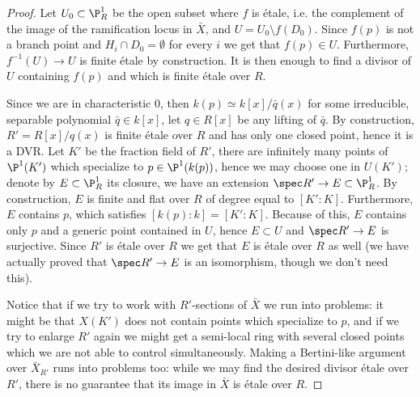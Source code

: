 \begin{lemma}
\begin{proof}
		Let $U_{0}\subset\P^{1}_{R}$ be the open subset where $f$ is étale, i.e. the complement of the image of the ramification locus in $\bar{X}$, and $U=U_{0}\setminus f(D_{0})$. Since $f(p)$ is not a branch point and $H_{i}\cap D_{0}=\emptyset$ for every $i$ we get that $f(p)\in U$. Furthermore, $f^{-1}(U)\to U$ is finite étale by construction. It is then enough to find a divisor of $U$ containing $f(p)$ and which is finite étale over $R$.


		Since we are in characteristic $0$, then $k(p)\simeq k[x]/\bar{q}(x)$ for some irreducible, separable polynomial $\bar{q}\in k[x]$, let $q\in R[x]$ be any lifting of $\bar{q}$. By construction, $R'=R[x]/q(x)$ is finite étale over $R$ and has only one closed point, hence it is a DVR. Let $K'$ be the fraction field of $R'$, there are infinitely many points of $\P^{1}(K')$ which specialize to $p\in\P^{1}(k(p))$, hence we may choose one in $U(K')$; denote by $E\subset \P^{1}_{R}$ its closure, we have an extension $\spec R'\to E\subset\P^{1}_{R}$. By construction, $E$ is finite and flat over $R$ of degree equal to $[K':K]$. Furthermore, $E$ contains $p$, which satisfies $[k(p):k]=[K':K]$. Because of this, $E$ contains only $p$ and a generic point contained in $U$, hence $E\subset U$ and $\spec R'\to E$ is surjective. Since $R'$ is étale over $R$ we get that $E$ is étale over $R$ as well (we have actually proved that $\spec R'\to E$ is an isomorphism, though we don't need this).


		Notice that if we try to work with $R'$-sections of $\bar{X}$ we run into problems: it might be that $X(K')$ does not contain points which specialize to $p$, and if we try to enlarge $R'$ again we might get a semi-local ring with several closed points which we are not able to control simultaneously. Making a Bertini-like argument over $\bar{X}_{R'}$ runs into problems too: while we may find the desired divisor étale over $R'$, there is no guarantee that its image in $\bar{X}$ is étale over $R$.






\end{proof}
\end{lemma}

